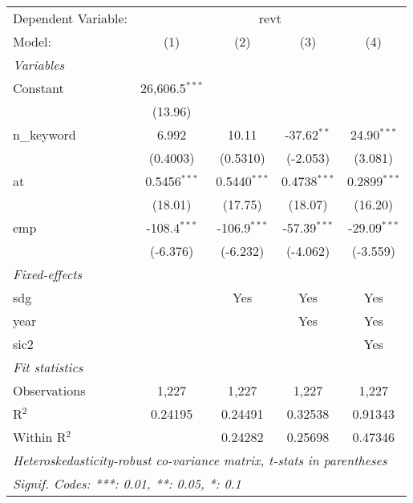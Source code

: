 
\begingroup
\centering
\begin{tabular}{lcccc}
   \tabularnewline \midrule \midrule
   Dependent Variable: & \multicolumn{4}{c}{revt}\\
   Model:       & (1)              & (2)            & (3)            & (4)\\  
   \midrule
   \emph{Variables}\\
   Constant     & 26,606.5$^{***}$ &                &                &   \\   
                & (13.96)          &                &                &   \\   
   n\_keyword   & 6.992            & 10.11          & -37.62$^{**}$  & 24.90$^{***}$\\   
                & (0.4003)         & (0.5310)       & (-2.053)       & (3.081)\\   
   at           & 0.5456$^{***}$   & 0.5440$^{***}$ & 0.4738$^{***}$ & 0.2899$^{***}$\\   
                & (18.01)          & (17.75)        & (18.07)        & (16.20)\\   
   emp          & -108.4$^{***}$   & -106.9$^{***}$ & -57.39$^{***}$ & -29.09$^{***}$\\   
                & (-6.376)         & (-6.232)       & (-4.062)       & (-3.559)\\   
   \midrule
   \emph{Fixed-effects}\\
   sdg          &                  & Yes            & Yes            & Yes\\  
   year         &                  &                & Yes            & Yes\\  
   sic2         &                  &                &                & Yes\\  
   \midrule
   \emph{Fit statistics}\\
   Observations & 1,227            & 1,227          & 1,227          & 1,227\\  
   R$^2$        & 0.24195          & 0.24491        & 0.32538        & 0.91343\\  
   Within R$^2$ &                  & 0.24282        & 0.25698        & 0.47346\\  
   \midrule \midrule
   \multicolumn{5}{l}{\emph{Heteroskedasticity-robust co-variance matrix, t-stats in parentheses}}\\
   \multicolumn{5}{l}{\emph{Signif. Codes: ***: 0.01, **: 0.05, *: 0.1}}\\
\end{tabular}
\par\endgroup


